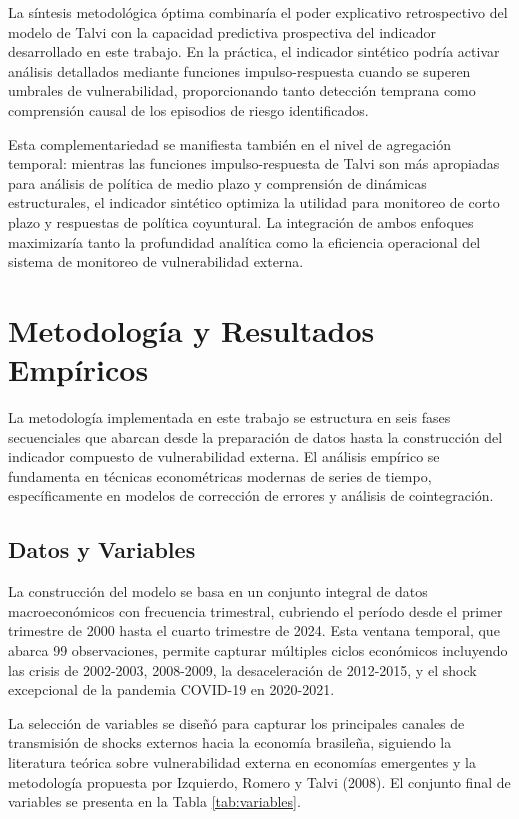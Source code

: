 \documentclass[3p,11pt]{elsarticle}
\begin{document}
La síntesis metodológica óptima combinaría el poder explicativo retrospectivo del modelo de Talvi con la capacidad predictiva prospectiva del indicador desarrollado en este trabajo. En la práctica, el indicador sintético podría activar análisis detallados mediante funciones impulso-respuesta cuando se superen umbrales de vulnerabilidad, proporcionando tanto detección temprana como comprensión causal de los episodios de riesgo identificados.

Esta complementariedad se manifiesta también en el nivel de agregación temporal: mientras las funciones impulso-respuesta de Talvi son más apropiadas para análisis de política de medio plazo y comprensión de dinámicas estructurales, el indicador sintético optimiza la utilidad para monitoreo de corto plazo y respuestas de política coyuntural. La integración de ambos enfoques maximizaría tanto la profundidad analítica como la eficiencia operacional del sistema de monitoreo de vulnerabilidad externa.

\section{Metodología y Resultados Empíricos}

La metodología implementada en este trabajo se estructura en seis fases secuenciales que abarcan desde la preparación de datos hasta la construcción del indicador compuesto de vulnerabilidad externa. El análisis empírico se fundamenta en técnicas econométricas modernas de series de tiempo, específicamente en modelos de corrección de errores y análisis de cointegración.

\subsection{Datos y Variables}

La construcción del modelo se basa en un conjunto integral de datos macroeconómicos con frecuencia trimestral, cubriendo el período desde el primer trimestre de 2000 hasta el cuarto trimestre de 2024. Esta ventana temporal, que abarca 99 observaciones, permite capturar múltiples ciclos económicos incluyendo las crisis de 2002-2003, 2008-2009, la desaceleración de 2012-2015, y el shock excepcional de la pandemia COVID-19 en 2020-2021.

La selección de variables se diseñó para capturar los principales canales de transmisión de shocks externos hacia la economía brasileña, siguiendo la literatura teórica sobre vulnerabilidad externa en economías emergentes y la metodología propuesta por Izquierdo, Romero y Talvi (2008). El conjunto final de variables se presenta en la Tabla \ref{tab:variables}.
\end{document}
